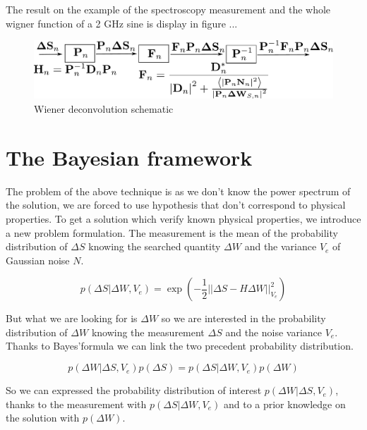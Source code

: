 \documentclass[english]{article}
\begin{document}
The result on the example of the spectroscopy measurement and the whole wigner function of a 2 GHz sine is display in figure ...


\begin{figure}[H]
\centering
\includegraphics[scale = 0.5]{Wiener_deconvolution}
\caption{Wiener deconvolution schematic}
\label{fig: Wiener deconvolution}
\end{figure}

\section{The Bayesian framework}

The problem of the above technique is as we don't know the power spectrum of the solution, we are forced to use hypothesis that don't correspond to physical properties. To get a solution which verify known physical properties, we introduce a new problem formulation. The measurement is the mean of the probability distribution of $\Delta S$ knowing the searched quantity $\Delta W$ and the variance $V_{e}$ of Gaussian noise $N$.

\begin{equation}
p\left(\Delta S | \Delta W, V_{e} \right) = \exp\left(-\frac{1}{2}||\Delta S - H\Delta W||_{V_{e}}^{2}\right)
\end{equation}

But what we are looking for is $\Delta W$ so we are interested in the probability distribution of $\Delta W$ knowing the measurement $\Delta S$ and the noise variance $V_{e}$. Thanks to Bayes'formula we can link the two precedent probability distribution.

\begin{equation}
p\left(\Delta W |\Delta S , V_{e} \right)p\left(\Delta S\right) = p\left(\Delta S | \Delta W, V_{e} \right)p\left(\Delta W \right)
\end{equation}

So we can expressed the probability distribution of interest $p\left(\Delta W |\Delta S , V_{e} \right)$, thanks to the measurement with $p\left(\Delta S | \Delta W, V_{e} \right)$ and to a prior knowledge on the solution with $p\left(\Delta W \right)$.
\end{document}
